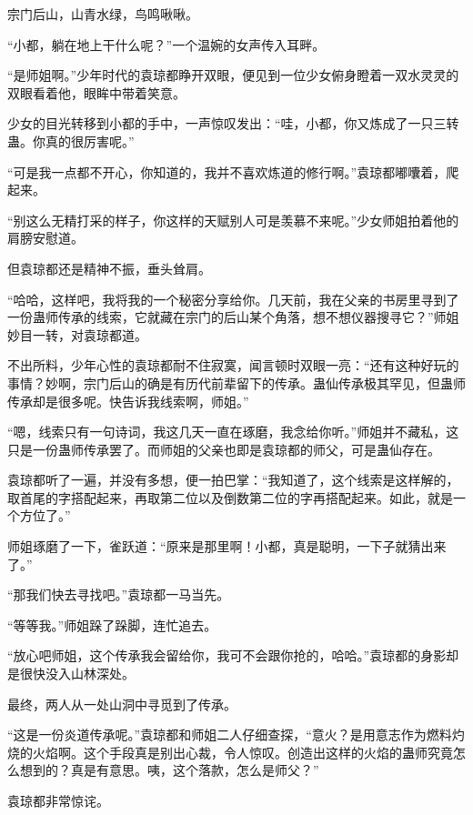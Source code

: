 
\begin{this_body}



宗门后山，山青水绿，鸟鸣啾啾。

“小都，躺在地上干什么呢？”一个温婉的女声传入耳畔。

“是师姐啊。”少年时代的袁琼都睁开双眼，便见到一位少女俯身瞪着一双水灵灵的双眼看着他，眼眸中带着笑意。

少女的目光转移到小都的手中，一声惊叹发出：“哇，小都，你又炼成了一只三转蛊。你真的很厉害呢。”

“可是我一点都不开心，你知道的，我并不喜欢炼道的修行啊。”袁琼都嘟囔着，爬起来。

“别这么无精打采的样子，你这样的天赋别人可是羡慕不来呢。”少女师姐拍着他的肩膀安慰道。

但袁琼都还是精神不振，垂头耸肩。

“哈哈，这样吧，我将我的一个秘密分享给你。几天前，我在父亲的书房里寻到了一份蛊师传承的线索，它就藏在宗门的后山某个角落，想不想仪器搜寻它？”师姐妙目一转，对袁琼都道。

不出所料，少年心性的袁琼都耐不住寂寞，闻言顿时双眼一亮：“还有这种好玩的事情？妙啊，宗门后山的确是有历代前辈留下的传承。蛊仙传承极其罕见，但蛊师传承却是很多呢。快告诉我线索啊，师姐。”

“嗯，线索只有一句诗词，我这几天一直在琢磨，我念给你听。”师姐并不藏私，这只是一份蛊师传承罢了。而师姐的父亲也即是袁琼都的师父，可是蛊仙存在。

袁琼都听了一遍，并没有多想，便一拍巴掌：“我知道了，这个线索是这样解的，取首尾的字搭配起来，再取第二位以及倒数第二位的字再搭配起来。如此，就是一个方位了。”

师姐琢磨了一下，雀跃道：“原来是那里啊！小都，真是聪明，一下子就猜出来了。”

“那我们快去寻找吧。”袁琼都一马当先。

“等等我。”师姐跺了跺脚，连忙追去。

“放心吧师姐，这个传承我会留给你，我可不会跟你抢的，哈哈。”袁琼都的身影却是很快没入山林深处。

最终，两人从一处山洞中寻觅到了传承。

“这是一份炎道传承呢。”袁琼都和师姐二人仔细查探，“意火？是用意志作为燃料灼烧的火焰啊。这个手段真是别出心裁，令人惊叹。创造出这样的火焰的蛊师究竟怎么想到的？真是有意思。咦，这个落款，怎么是师父？”

袁琼都非常惊诧。


\end{this_body}
